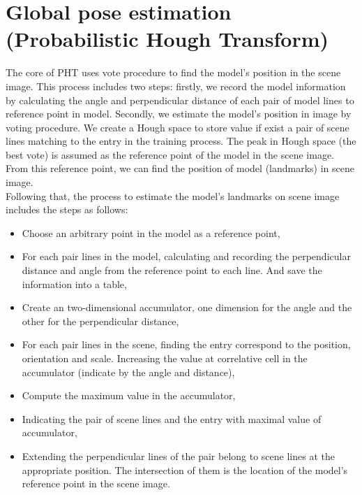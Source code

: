 \section{Global pose estimation (Probabilistic Hough Transform)}
The core of PHT uses vote procedure to find the model's position in the scene image. This process includes two steps: firstly, we record the model information by calculating the angle and perpendicular distance of each pair of model lines to reference point in model. Secondly, we estimate the model's position in image by voting procedure. We create a Hough space to store value if exist a pair of scene lines matching to the entry in the training process. The peak in Hough space (the best vote) is assumed as the reference point of the model in the scene image. From this reference point, we can find the position of model (landmarks) in scene image.\\
Following that, the process to estimate the model's landmarks on scene image includes the steps as follows:
\begin{itemize}
\item Choose an arbitrary point in the model as a reference point,
\item For each pair lines in the model, calculating and recording the perpendicular distance and angle from the reference point to each line. And save the information into a table,
\item Create an two-dimensional accumulator, one dimension for the angle and the other for the perpendicular distance,
\item For each pair lines in the scene, finding the entry correspond to the position, orientation and scale. Increasing the value at correlative cell in the accumulator (indicate by the angle and distance),
\item Compute the maximum value in the accumulator,
\item Indicating the pair of scene lines and the entry with maximal value of accumulator,
\item Extending the perpendicular lines of the pair belong to scene lines at the appropriate position. The intersection of them is the location of the model's reference point in the scene image.
\end{itemize}
